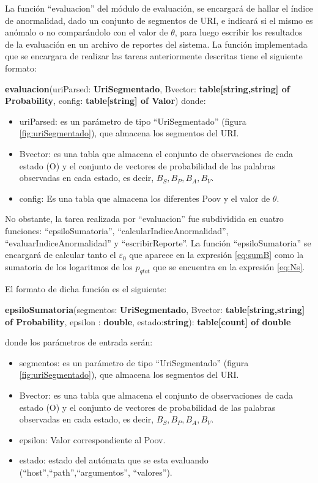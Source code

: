 La función ``evaluacion'' del módulo de evaluación, se encargará de hallar el  índice de anormalidad, dado un conjunto de segmentos de URI, e indicará si el mismo es anómalo o no comparándolo con el valor
de $\theta$, para luego escribir los resultados de la evaluación en un archivo de reportes del sistema. La función implementada que se encargara de realizar las tareas anteriormente descritas tiene el siguiente formato:

\textbf{evaluacion}(uriParsed: \textbf{UriSegmentado}, Bvector: \textbf{table[string,string]
of Probability}, config: \textbf{table[string] of Valor})
donde:
\begin{itemize}
\item uriParsed: es un parámetro de tipo ``UriSegmentado'' (figura \ref{fig:uriSegmentado}), que
almacena los segmentos del URI.
\item Bvector: es una tabla que almacena el conjunto de observaciones de cada estado (O) y el conjunto de vectores de probabilidad de las palabras observadas en cada estado, es decir, $B_{S}, B_{P}, B_{A}, B_{V}$.
\item config: Es una tabla que almacena los diferentes Poov y el valor de $\theta$.
\end{itemize}

No obstante, la tarea realizada por ``evaluacion'' fue subdividida en cuatro funciones: ``epsiloSumatoria'', ``calcularIndiceAnormalidad'',
``evaluarIndiceAnormalidad'' y ``escribirReporte''. La función ``epsiloSumatoria'' se encargará de calcular tanto el $\varepsilon_{0}$ que aparece en la expresión \ref{eq:sumB}
como la sumatoria de los logaritmos de los $p_{qtot}$ que se encuentra en la
expresión \ref{eq:Ns}.

El formato de dicha función es el siguiente:

\textbf{epsiloSumatoria}(segmentos: \textbf{UriSegmentado},
Bvector: \textbf{table[string,string] of Probability}, epsilon : \textbf{double}, estado:\textbf{string}):
\textbf{table[count] of double}

donde los parámetros de entrada serán:
\begin{itemize}
\item segmentos: es un parámetro de tipo ``UriSegmentado'' (figura \ref{fig:uriSegmentado}), que
almacena los segmentos del URI.
\item Bvector: es una tabla que almacena el conjunto de observaciones de cada estado (O) y el conjunto de vectores de probabilidad de las palabras observadas en cada estado, es decir, $B_{S}, B_{P}, B_{A}, B_{V}$.
\item epsilon: Valor correspondiente al Poov.
\item estado: estado del autómata que se esta evaluando (``host'',``path'',``argumentos'',
``valores'').
\end{itemize}

